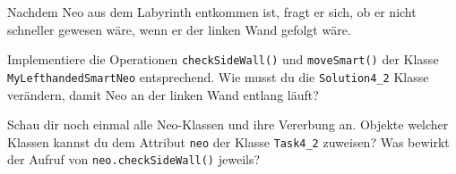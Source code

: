 
    Nachdem Neo aus dem Labyrinth entkommen ist, fragt er sich, ob er nicht schneller gewesen wäre, wenn er der linken Wand gefolgt wäre.

        \subexcercise Implementiere die Operationen \lstinline{checkSideWall()} und \lstinline{moveSmart()} der Klasse \lstinline{MyLefthandedSmartNeo} entsprechend.
        \subexcercise Wie musst du die \lstinline{Solution4_2} Klasse verändern, damit Neo an der linken Wand entlang läuft?

        \subexcercise Schau dir noch einmal alle Neo-Klassen und ihre Vererbung an.
        Objekte welcher Klassen kannst du dem Attribut \lstinline{neo} der Klasse \lstinline{Task4_2} zuweisen?
        Was bewirkt der Aufruf von \lstinline{neo.checkSideWall()} jeweils?



